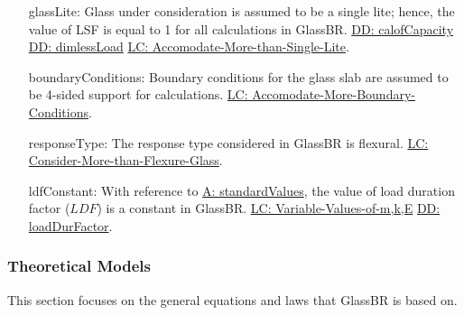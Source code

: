 \documentclass[12pt]{article}
\begin{document}
\begin{itemize}
\item[glassLite:\phantomsection\label{assumpGL}]Glass under consideration is assumed to be a single lite; hence, the value of LSF is equal to 1 for all calculations in GlassBR. \hyperref[DD:calofCapacity]{DD: calofCapacity} \hyperref[DD:dimlessLoad]{DD: dimlessLoad} \hyperref[accMoreThanSingleLite]{LC: Accomodate-More-than-Single-Lite}.
\item[boundaryConditions:\phantomsection\label{assumpBC}]Boundary conditions for the glass slab are assumed to be 4-sided support for calculations. \hyperref[accMoreBoundaryConditions]{LC: Accomodate-More-Boundary-Conditions}.
\item[responseType:\phantomsection\label{assumpRT}]The response type considered in GlassBR is flexural. \hyperref[considerMoreThanFlexGlass]{LC: Consider-More-than-Flexure-Glass}.
\item[ldfConstant:\phantomsection\label{assumpLDFC}]With reference to \hyperref[assumpSV]{A: standardValues}, the value of load duration factor ($LDF$) is a constant in GlassBR. \hyperref[varValsOfmkE]{LC: Variable-Values-of-m,k,E} \hyperref[DD:loadDurFactor]{DD: loadDurFactor}.
\end{itemize}
\subsubsection{Theoretical Models}
\label{Sec:TMs}
This section focuses on the general equations and laws that GlassBR is based on.
\par~
\end{document}

